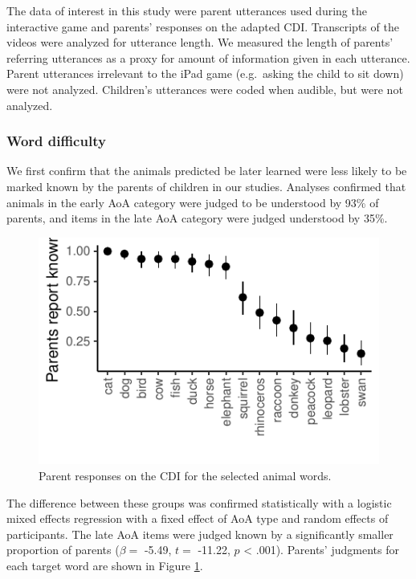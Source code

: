 \documentclass[10pt, letterpaper]{article}
\newenvironment{CodeChunk}{}{}
\begin{document}
The data of interest in this study were parent utterances used during
the interactive game and parents' responses on the adapted CDI.
Transcripts of the videos were analyzed for utterance length. We
measured the length of parents' referring utterances as a proxy for
amount of information given in each utterance. Parent utterances
irrelevant to the iPad game (e.g.~asking the child to sit down) were not
analyzed. Children's utterances were coded when audible, but were not
analyzed.

\subsubsection{Word difficulty}\label{word-difficulty}

We first confirm that the animals predicted be later learned were less
likely to be marked known by the parents of children in our studies.
Analyses confirmed that animals in the early AoA category were judged to
be understood by 93\% of parents, and items in the late AoA category
were judged understood by 35\%.

\begin{CodeChunk}
\begin{figure}[tb]
\includegraphics{figs/difficulty_fig-1} \caption[Parent responses on the CDI for the selected animal words]{Parent responses on the CDI for the selected animal words.}\label{fig:difficulty_fig}
\end{figure}
\end{CodeChunk}

The difference between these groups was confirmed statistically with a
logistic mixed effects regression with a fixed effect of AoA type and
random effects of participants. The late AoA items were judged known by
a significantly smaller proportion of parents (\(\beta =\) -5.49,
\(t =\) -11.22, \(p\) \textless{} .001). Parents' judgments for each
target word are shown in Figure \ref{fig:difficulty_fig}.
\end{document}
